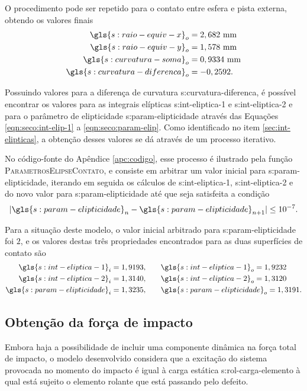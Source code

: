 \documentclass[12pt,oneside,english,brazil,lmodern,siglas,simbolos,cite=num]{ucsmonograph}
\begin{document}
	O procedimento pode ser repetido para o contato entre esfera e pista externa, obtendo os valores finais
	\begin{align*}
		\gls{s:raio-equiv-x}_o &= 2,682\ \text{mm}\\
		\gls{s:raio-equiv-y}_o &= 1,578\ \text{mm}\\
		\gls{s:curvatura-soma}_o &= 0,9334\ \text{mm}\\
		\gls{s:curvatura-diferenca}_o &= -0,2592.
	\end{align*}
	
	Possuindo valores para a diferença de curvatura \gls{s:curvatura-diferenca}, é possível encontrar os valores para as integrais elípticas \gls{s:int-eliptica-1} e \gls{s:int-eliptica-2} e para o parâmetro de elipticidade \gls{s:param-elipticidade} através das Equações \ref{eqn:seco:int-elip-1} a \ref{eqn:seco:param-elip}.
	Como identificado no item \ref{sec:int-elipticas}, a obtenção desses valores se dá através de um processo iterativo.
	
	No código-fonte do Apêndice \ref{apc:codigo}, esse processo é ilustrado pela função \textsc{ParametrosElipseContato}, e consiste em arbitrar um valor inicial para \gls{s:param-elipticidade}, iterando em seguida os cálculos de \gls{s:int-eliptica-1}, \gls{s:int-eliptica-2} e do novo valor para \gls{s:param-elipticidade} até que seja satisfeita a condição
	\begin{equation} \label{eqn:mdl:cond-parada-k}
		|\gls{s:param-elipticidade}_n - \gls{s:param-elipticidade}_{n+1}| \leq 10^{-7}.
	\end{equation}
	
	Para a situação deste modelo, o valor inicial arbitrado para \gls{s:param-elipticidade} foi $2$, e os valores destas três propriedades encontrados para as duas superfícies de contato são
	\begin{align*}
		\gls{s:int-eliptica-1}_i = 1,9193, &\qquad
		\gls{s:int-eliptica-1}_o = 1,9232 \\
		\gls{s:int-eliptica-2}_i = 1,3140, &\qquad
		\gls{s:int-eliptica-2}_o = 1,3120 \\
		\gls{s:param-elipticidade}_i = 1,3235, &\qquad
		\gls{s:param-elipticidade}_o = 1,3191.
	\end{align*}
	
	\subsection{Obtenção da força de impacto} \label{sec:mdl:forca-impacto}
	Embora haja a possibilidade de incluir uma componente dinâmica na força total de impacto, o modelo desenvolvido considera que a excitação do sistema provocada no momento do impacto é igual à carga estática \gls{s:rol-carga-elemento} à qual está sujeito o elemento rolante que está passando pelo defeito.
	
\end{document}
